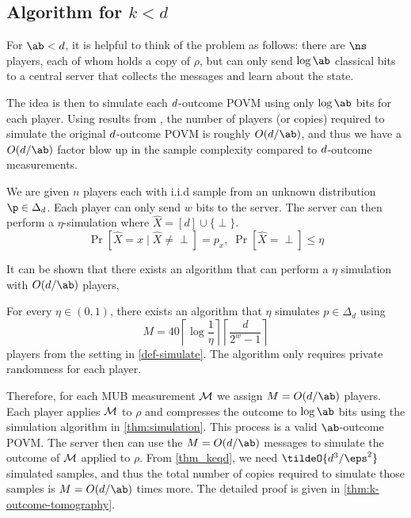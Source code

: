 \subsection{Algorithm for $k < d$}
For $\ab<\dims$, it is helpful to think of the problem as follows: there are $\ns$ players, each of whom holds a copy of $\rho$, but can only send $\log\ab$ classical bits to a central server that collects the messages and learn about the state. 

The idea is then to simulate each $d$-outcome POVM using only $\log\ab$ bits for each player. 
Using results from \cite{ACT:19:IT2}, the number of players (or copies) required to simulate the original $d$-outcome POVM is roughly $O(\dims/\ab)$, and thus we have a $O(\dims/\ab)$ factor blow up in the sample complexity compared to $d$-outcome measurements.

\begin{definition} 
\label{def-simulate}
We are given $n$ players each with i.i.d sample from an unknown distribution $\p \in \Delta_d$. Each player can only send $w$ bits to the server. The server can then perform a $\eta$-simulation where $\hat{X} = [d] \cup \{\perp\}$.
\begin{equation}
    \Pr[\hat{X} = x \mid \hat{X} \neq \perp] = p_x, \; \Pr[\hat{X} = \perp] \leq \eta
\end{equation}

It can be shown that there exists an algorithm that can perform a $\eta$ simulation with $O(\dims/\ab)$ players,

\end{definition}
\begin{theorem}
\label{thm:simulation}
   For every $\eta \in (0,1)$, there exists an algorithm that $\eta$ simulates $p \in \Delta_d$ using 
   \begin{equation}
       M = 40 \left\lceil \log{\frac{1}{\eta}} \right\rceil \left\lceil \frac{d}{2^w - 1} \right\rceil
   \end{equation}
   players from the setting in \cref{def-simulate}. The algorithm only requires private randomness for each player.
\end{theorem}
Therefore, for each MUB measurement $\mathcal{M}$ we assign $M=O(\dims/\ab)$ players. 
Each player applies $\mathcal{M}$ to $\rho$ and compresses the outcome to $\log\ab$ bits using the simulation algorithm in \cref{thm:simulation}. 
This process is a valid $\ab$-outcome POVM. 
The server then can use the $M=O(\dims/\ab)$ messages to simulate the outcome of $\mathcal{M}$ applied to $\rho$.
From \cref{thm_keqd}, we need $\tildeO{\dims^3/\eps^2}$ simulated samples, and thus the total number of copies required to simulate those samples is $M=O(\dims/\ab)$ times more. The detailed proof is given in \cref{thm:k-outcome-tomography}.

